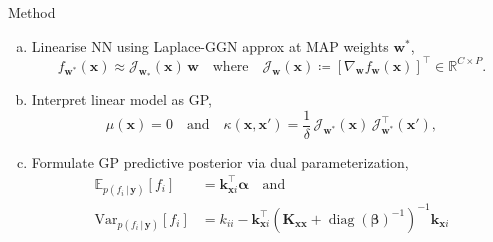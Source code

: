 \documentclass[final,12pt]{beamer}
\newlength{\colwidth}
\newcommand{\mathbold}[1]{\bm{#1}}
\newcommand{\mbf}[1]{\mathbf{#1}}
\DeclareMathOperator{\diag}{diag}
\newcommand{\valpha}[0]{\mathbold{\alpha}}
\newcommand{\vbeta}[0]{\mathbold{\beta}}
\renewcommand{\mid}{\,|\,}
\newcommand{\vk}{\mbf{k}}
\newcommand{\vw}{\mbf{w}}
\newcommand{\vx}{\mbf{x}}
\newcommand{\vy}{\mbf{y}}
\newcommand{\Jac}[2]{\mathcal{J}_{#1}(#2)}
\newcommand{\JacT}[2]{\mathcal{J}_{#1}^\top(#2)}
\newcommand{\MKxx}{\mbf{K}_{\mbf{x}\mbf{x}}}
\newcommand{\R}{\mathbb{R}}
\newcommand{\myexpect}{\mathbb{E}}
\newcommand{\weights}{\ensuremath{\mathbf{w}}}
\begin{document}
\begin{frame}[t]
\begin{columns}[t]
\begin{column}{\colwidth}
\begin{block}{Method}
  \begin{enumerate}[(a)]
    \item Linearise NN using \alert{Laplace-GGN approx} at MAP weights $\weights^{*}$,
    \begin{equation*}
        f_{\weights^*}(\vx) \approx \Jac{\weights_*}{\vx} \, \weights \quad
    \text{where} \quad \Jac{\weights}{\vx} \coloneqq \left[ \nabla_\weights f_\weights(\vx)\right]^\top \in \R^{C \times P}.
    \end{equation*}
    \item Interpret linear model as GP,
        \begin{equation*}
            \mu(\vx) =  0 \quad \text{and} \quad
        \kappa(\vx, \vx') = \frac{1}{\delta} \, \Jac{\weights^*}{\vx} \, \JacT{\weights^*}{\vx'},
        \end{equation*}
    \item Formulate GP predictive posterior via dual parameterization,
        \begin{align}  \label{eq:gp_pred_mean}
        \myexpect_{p(f_i \mid\vy)}[f_i] &= \vk_{\vx i}^\top \valpha \quad \text{and} \\
\label{eq:gp_pred_var}
        \mathrm{Var}_{p(f_i \mid \vy)}[f_i] &= k_{ii} - \vk_{\vx i}^\top ( \MKxx + \diag(\vbeta)^{-1})^{-1} \vk_{\vx i}
        \end{align}
    \end{enumerate}


\end{block}
\end{column}
\end{columns}
\end{frame}
\end{document}
